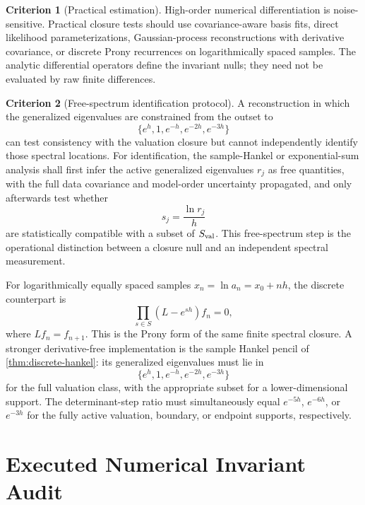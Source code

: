 \documentclass[aps,prd,reprint,onecolumn,nofootinbib,superscriptaddress,showkeys]{revtex4-2}
\numberwithin{equation}{section}
\theoremstyle{definition}
\newtheorem{criterion}{Criterion}[section]
\theoremstyle{plain}
\begin{document}
\begin{criterion}[Practical estimation]
High-order numerical differentiation is noise-sensitive.  Practical closure tests should use covariance-aware basis fits, direct likelihood parameterizations, Gaussian-process reconstructions with derivative covariance, or discrete Prony recurrences on logarithmically spaced samples.  The analytic differential operators define the invariant nulls; they need not be evaluated by raw finite differences.
\end{criterion}

\begin{criterion}[Free-spectrum identification protocol]\label{crit:free-spectrum}
A reconstruction in which the generalized eigenvalues are constrained from the outset to
\[
\{e^{h},1,e^{-h},e^{-2h},e^{-3h}\}
\]
can test consistency with the valuation closure but cannot independently identify those spectral locations.  For identification, the sample-Hankel or exponential-sum analysis shall first infer the active generalized eigenvalues $r_j$ as free quantities, with the full data covariance and model-order uncertainty propagated, and only afterwards test whether
\[
 s_j=\frac{\ln r_j}{h}
\]
are statistically compatible with a subset of $S_{\rm val}$.  This free-spectrum step is the operational distinction between a closure null and an independent spectral measurement.
\end{criterion}

For logarithmically equally spaced samples \(x_n=\ln a_n=x_0+nh\), the discrete counterpart is
\begin{equation}
\prod_{s\in S}(L-e^{sh})f_n=0,
\end{equation}
where \(Lf_n=f_{n+1}\).  This is the Prony form of the same finite spectral closure.  A stronger derivative-free implementation is the sample Hankel pencil of \cref{thm:discrete-hankel}: its generalized eigenvalues must lie in
\begin{equation}
\{e^{h},1,e^{-h},e^{-2h},e^{-3h}\}
\end{equation}
for the full valuation class, with the appropriate subset for a lower-dimensional support.  The determinant-step ratio must simultaneously equal \(e^{-5h}\), \(e^{-6h}\), or \(e^{-3h}\) for the fully active valuation, boundary, or endpoint supports, respectively.



\section{Executed Numerical Invariant Audit}\label{sec:executed-audit}
\end{document}
